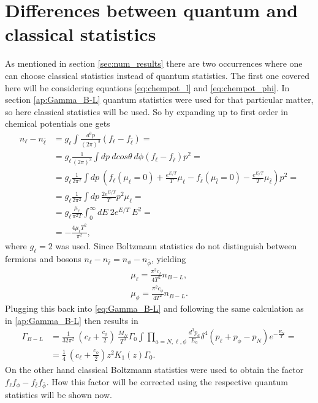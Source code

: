 \section{Differences between quantum and classical statistics}
\label{ap:statistics}
As mentioned in section \ref{sec:num_results} there are two occurrences where one can choose classical statistics instead of quantum statistics. The first one covered here will be considering equations \eqref{eq:chempot_l} and \eqref{eq:chempot_phi}. In section \ref{ap:Gamma_B-L} quantum statistics were used for that particular matter, so here classical statistics will be used. So by expanding up to first order in chemical potentials one gets 
\begin{align*}
n_\ell-n_{\bar{\ell}}&=g_\ell\int\frac{d^3p}{\left(2\pi\right)^3}\left(f_\ell-f_{\bar{\ell}}\right)=\\
&=g_\ell\frac{1}{\left(2\pi\right)^3}\int dp\:dcos\theta \:d\phi\left(f_\ell-f_{\bar{\ell}}\right)p^2=\\
&=g_\ell\frac{1}{2\pi^2}\int dp \: \left(f_\ell\left(\mu_\ell=0\right)+\frac{e^{E/T}}{T}\mu_\ell-f_{\bar{\ell}}\left(\mu_{\bar{l}}=0\right)-\frac{e^{E/T}}{T}\mu_{\bar{\ell}}\right)p^2=\\
&=g_\ell\frac{1}{2\pi^2}\int dp\: \frac{2e^{E/T}}{T}p^2\mu_\ell=\\
&=g_\ell\frac{\mu_\ell}{\pi^2T}\int_{0}^{\infty}dE\:2e^{E/T}\:E^2=\\
&=-\frac{4\mu_\ell T^2}{\pi^2},
\end{align*}
where $g_\ell=2$ was used.
Since Boltzmann statistics do not distinguish between fermions and bosons $n_\ell-n_{\bar{\ell}}=n_\phi-n_{\bar{\phi}}$, yielding
\begin{align*}
\mu_\ell=\frac{\pi^2c_\ell}{4T^2}n_{B-L},\\
\mu_\phi=\frac{\pi^2c_\phi}{4T^2}n_{B-L}.
\end{align*}
Plugging this back into \eqref{eq:Gamma_B-L} and following the same calculation as in \ref{ap:Gamma_B-L} then results in
\begin{align*}
\Gamma_{B-L}&=\frac{1}{32\pi^2}\:\left(c_\ell+\frac{c_\phi}{2}\right)\:\frac{M_N}{T^3}\Gamma_0\int\prod_{a=N,\ell,\phi}\frac{d^3p_a}{E_a}\delta^4\left(p_\ell+p_\phi-p_N\right)e^{-\frac{E_N}{T}}=\\
&=\frac{1}{4}\:\left(c_\ell+\frac{c_\phi}{2}\right)z^2K_1(z)\Gamma_0.
\end{align*}
On the other hand classical Boltzmann statistics were used to obtain the factor $f_\ell f_\phi-f_{\bar{\ell}}f_{\bar{\phi}}$. How this factor will be corrected using the respective quantum statistics will be shown now. \newline\indent
